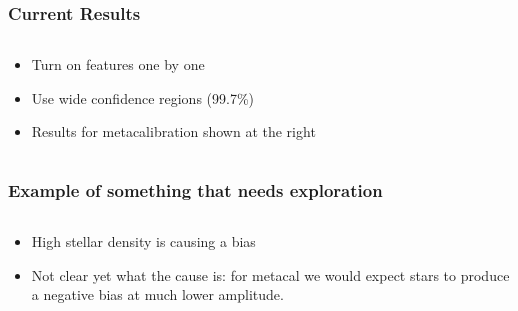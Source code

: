 \documentclass{beamer}
\begin{document}
\frame
{


    \frametitle{Current Results}


    \begin{columns}
        \begin{column}{0.5\textwidth}
        \begin{itemize}

            \item Turn on features one by one
            \item Use wide confidence regions (99.7\%)
            \item Results for metacalibration shown at the right

        \end{itemize}
        \end{column}
        \begin{column}{0.5\textwidth}
            \begin{center}
                \texttt{[image: \{mvals-fig.png]}}
            \end{center}
            
        \end{column}
    \end{columns}


}

\frame
{


    \frametitle{Example of something that needs exploration}


    \begin{columns}
        \begin{column}{0.5\textwidth}
        \begin{itemize}

            \item High stellar density is causing a bias

            \item Not clear yet what the cause is: for metacal we would
                expect stars to produce a negative bias at much
                lower amplitude.

        \end{itemize}
        \end{column}
        \begin{column}{0.5\textwidth}
            \begin{center}
                \texttt{[image: \{m-vs-density.png]}}
            \end{center}
            
        \end{column}
    \end{columns}


}
\end{document}

